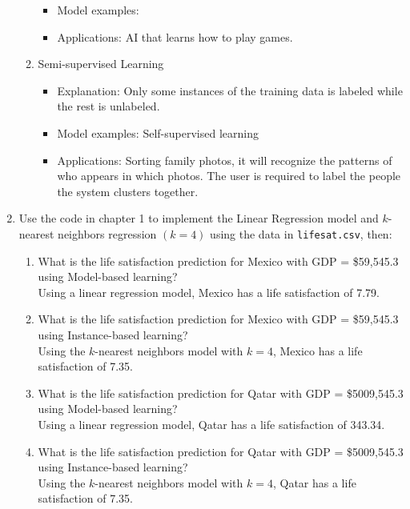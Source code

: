 \documentclass[a4paper,10pt]{article}
\begin{document}
\begin{enumerate}
\begin{enumerate}
\begin{itemize}
			\item Model examples: 
			\item Applications:
			AI that learns how to play games. 
		\end{itemize}
		\item Semi-supervised Learning
		\begin{itemize}
			\item Explanation:
			Only some instances of the training data is labeled while the rest is unlabeled.
			\item Model examples:
			Self-supervised learning
			\item Applications:
			Sorting family photos, it will recognize the patterns of who appears in which photos. The user is required to label the people the system clusters together.
		\end{itemize}
	\end{enumerate}
	
	\item Use the code in chapter 1 to implement the Linear Regression model and \( k \)-nearest neighbors regression \( (k=4) \) using the data in \texttt{lifesat.csv}, then:
	\begin{enumerate}
		\item What is the life satisfaction prediction for Mexico with GDP = \$59,545.3 using Model-based learning? \\
			Using a linear regression model, Mexico has a life satisfaction of 7.79.
			
		\item What is the life satisfaction prediction for Mexico with GDP = \$59,545.3 using Instance-based learning? \\
			Using the \( k \)-nearest neighbors model with \( k=4 \), Mexico has a life satisfaction of 7.35.
			
		\item What is the life satisfaction prediction for Qatar with GDP = \$5009,545.3 using Model-based learning? \\
			Using a linear regression model, Qatar has a life satisfaction of 343.34.
			
		\item What is the life satisfaction prediction for Qatar with GDP = \$5009,545.3
		using Instance-based learning? \\
			Using the \( k \)-nearest neighbors model with \( k=4 \), Qatar has a life satisfaction of 7.35.
			

\end{enumerate}
\end{enumerate}
\end{document}
